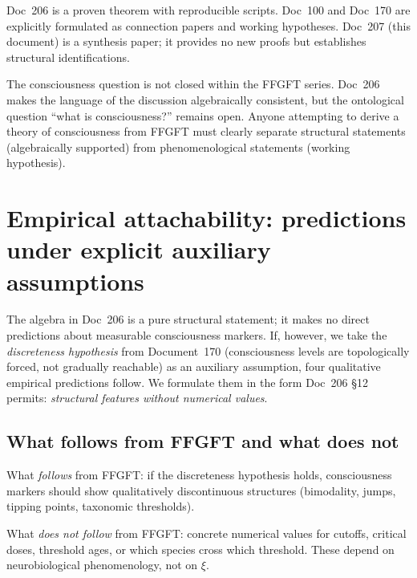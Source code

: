 Doc~206 is a proven theorem with reproducible scripts. Doc~100 and Doc~170 are explicitly formulated as connection papers and working hypotheses. Doc~207 (this document) is a synthesis paper; it provides no new proofs but establishes structural identifications.

\begin{interpretation}
The consciousness question is not closed within the FFGFT series. Doc~206 makes the language of the discussion algebraically consistent, but the ontological question ``what is consciousness?'' remains open. Anyone attempting to derive a theory of consciousness from FFGFT must clearly separate structural statements (algebraically supported) from phenomenological statements (working hypothesis).
\end{interpretation}

\section{Empirical attachability: predictions under explicit auxiliary assumptions}\label{sec:predictions}

The algebra in Doc~206 is a pure structural statement; it makes no direct predictions about measurable consciousness markers. If, however, we take the \emph{discreteness hypothesis} from Document~170 (consciousness levels are topologically forced, not gradually reachable) as an auxiliary assumption, four qualitative empirical predictions follow. We formulate them in the form Doc~206 \S12 permits: \emph{structural features without numerical values}.

\subsection{What follows from FFGFT and what does not}\label{sec:predictions_follows}

\begin{important}
What \emph{follows} from FFGFT: if the discreteness hypothesis holds, consciousness markers should show qualitatively discontinuous structures (bimodality, jumps, tipping points, taxonomic thresholds).

What \emph{does not follow} from FFGFT: concrete numerical values for cutoffs, critical doses, threshold ages, or which species cross which threshold. These depend on neurobiological phenomenology, not on $\xi$.
\end{important}

